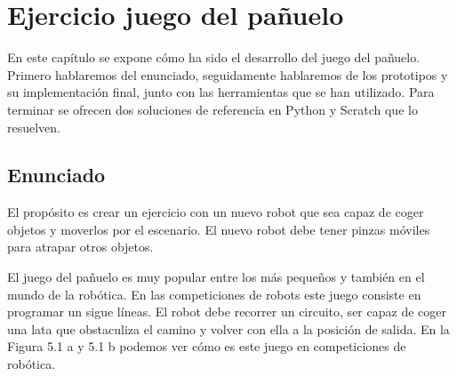 \chapter{Ejercicio juego del pañuelo} \label{gripper}
En este capítulo se expone cómo ha sido el desarrollo del juego del pañuelo. Primero hablaremos del enunciado, seguidamente hablaremos de los prototipos y su implementación final, junto con las herramientas que se han utilizado. Para terminar se ofrecen dos soluciones de referencia en Python y Scratch que lo resuelven.

\section{Enunciado}
El propósito es crear un ejercicio con un nuevo robot que sea capaz de coger objetos y moverlos por el escenario. El nuevo robot debe tener pinzas móviles para atrapar otros objetos. 

El juego del pañuelo es muy popular entre los más pequeños y también en el mundo de la robótica. En las competiciones de robots este juego consiste en programar un sigue líneas. El robot debe recorrer un circuito, ser capaz de coger una lata que obstaculiza el camino y volver con ella a la posición de salida. En la Figura 5.1 a y 5.1 b podemos ver cómo es este juego en competiciones de robótica.


